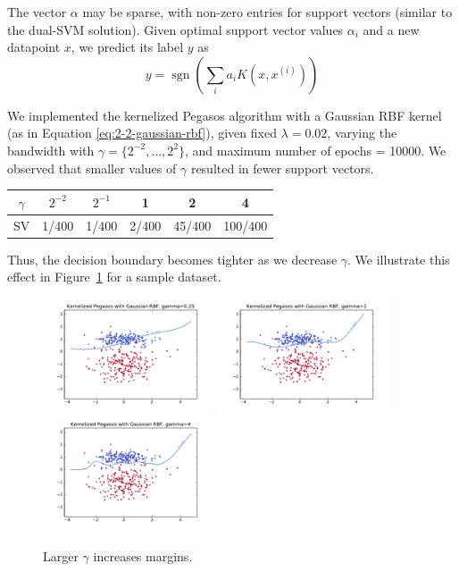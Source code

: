 \documentclass{article}
\DeclareMathOperator{\sgn}{sgn}
\begin{document}
\begin{multicols}{2}
The vector $\alpha$ may be sparse, with non-zero entries for support vectors (similar to the dual-SVM solution). Given optimal support vector values $\alpha_i$ and a new datapoint $x$, we predict its label $y$ as
\begin{equation}
    y = \sgn\left(\sum_i{a_i K(x,x^{(i)})}\right)
\end{equation}

We implemented the kernelized Pegasos algorithm with a Gaussian RBF kernel
(as in Equation \ref{eq:2-2-gaussian-rbf}), given fixed $\lambda = 0.02$, varying the bandwidth with $\gamma = \{2^{-2},\dots,2^2\}$, and maximum number of epochs = 10000.
We observed that smaller values of $\gamma$ resulted in fewer support vectors.

\begin{center}
\begin{tabular}{|c||c|c|c|c|c|}
\hline
$\gamma$ & $2^{-2}$ & $2^{-1}$ & 1 & 2 & 4\\ \hline
SV & 1/400 & 1/400 & 2/400 & 45/400 & 100/400 \\ \hline
\end{tabular}
\end{center}
Thus, the decision boundary becomes tighter as we decrease $\gamma$. We illustrate this effect in Figure~\ref{fig:3-3-gamma} for a sample dataset.

\begin{figure}[t]
   \centering
	\includegraphics[width=2in]{img/3-2-margins/3-3-kernel-025.pdf}
	\includegraphics[width=2in]{img/3-2-margins/3-3-kernel-1.pdf}
	\includegraphics[width=2in]{img/3-2-margins/3-3-kernel-4.pdf}
   \caption{Larger $\gamma$ increases margins.}
   \label{fig:3-3-gamma}
\end{figure}


\end{multicols}
\end{document}
